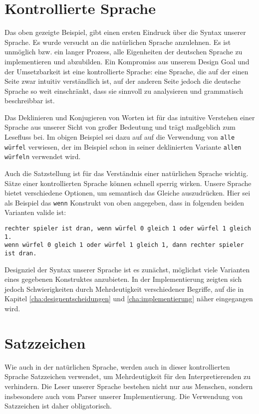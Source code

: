 \section{Kontrollierte Sprache}
\label{sec:kontrollierte_sprache}
	Das oben gezeigte Beispiel, gibt einen ersten Eindruck über die Syntax unserer Sprache. Es wurde versucht \dg an die natürlichen Sprache anzulehnen. Es ist unmöglich bzw. ein langer Prozess, alle Eigenheiten der deutschen Sprache zu implementieren und abzubilden. Ein Kompromiss aus unserem Design Goal und der Umsetzbarkeit ist eine kontrollierte Sprache: eine Sprache, die auf der einen Seite zwar intuitiv verständlich ist, auf der anderen Seite jedoch die deutsche Sprache so weit einschränkt, dass sie sinnvoll zu analysieren und grammatisch beschreibbar ist.

	Das Deklinieren und Konjugieren von Worten ist für das intuitive Verstehen einer Sprache aus unserer Sicht von großer Bedeutung und trägt maßgeblich zum Lesefluss bei. Im obigen Beispiel sei dazu auf auf die Verwendung von \texttt{alle würfel} verwiesen, der im Beispiel schon in seiner deklinierten Variante \texttt{allen würfeln} verwendet wird.

	Auch die Satzstellung ist für das Verständnis einer natürlichen Sprache wichtig. Sätze einer kontrollierten Sprache können schnell sperrig wirken. Unsere Sprache bietet verschiedene Optionen, um semantisch das Gleiche auszudrücken. Hier sei als Beispiel das \texttt{wenn} Konstrukt von oben angegeben, dass in folgenden beiden Varianten valide ist:
\begin{lstlisting}
rechter spieler ist dran, wenn würfel 0 gleich 1 oder würfel 1 gleich 1.
wenn würfel 0 gleich 1 oder würfel 1 gleich 1, dann rechter spieler ist dran.
\end{lstlisting}
	Designziel der Syntax unserer Sprache ist es zunächst, möglichst viele Varianten eines gegebenen Konstruktes anzubieten. In der Implementierung zeigten sich jedoch Schwierigkeiten durch Mehrdeutigkeit verschiedener Begriffe, auf die in Kapitel \ref{cha:designentscheidungen} und \ref{cha:implementierung} näher eingegangen wird.

\section{Satzzeichen}
\label{sec:satzzeichen}
	Wie auch in der natürlichen Sprache, werden auch in dieser kontrollierten Sprache Satzzeichen verwendet, um Mehrdeutigkeit für den Interpretierenden zu verhindern. Die Leser unserer Sprache bestehen nicht nur aus Menschen, sondern insbesondere auch vom Parser unserer Implementierung. Die Verwendung von Satzzeichen ist daher obligatorisch.

